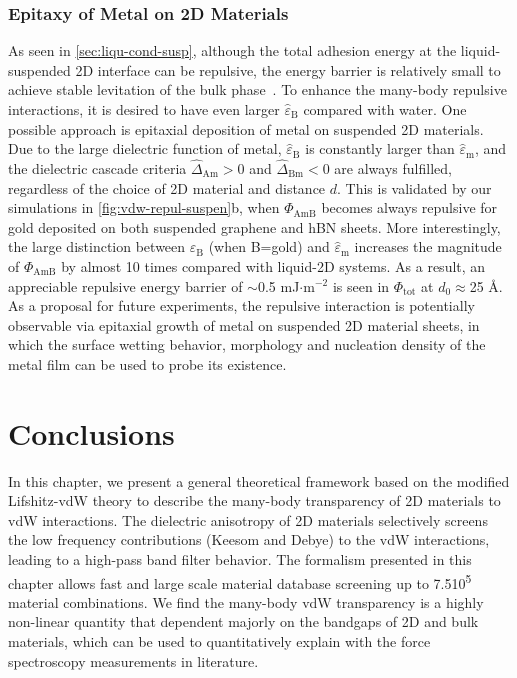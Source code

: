\subsubsection{Epitaxy of Metal on 2D Materials}
\label{sec:epitaxy-metal-2d}

As seen in \autoref{sec:liqu-cond-susp}, although the total adhesion
energy at the liquid-suspended 2D interface can be repulsive, the
energy barrier is relatively small to achieve stable levitation of the
bulk phase~\cite{Zhao_2019_casimir_trap}.
%
To enhance the many-body repulsive interactions, it is desired to have
even larger $\hat{\varepsilon}_{\mathrm{B}}$ compared with water. One
possible approach is epitaxial deposition of metal on suspended 2D
materials.
%
Due to the large dielectric function of metal,
$\hat{\varepsilon}_{\mathrm{B}}$ is constantly larger than
$\hat{\varepsilon}_{\mathrm{m}}$, and the dielectric cascade criteria
$\hat{\Delta}_{\mathrm{Am}} > 0$ and $\hat{\Delta}_{\mathrm{Bm}} < 0$
are always fulfilled, regardless of the choice of 2D material and
distance $d$.
%
This is validated by our simulations in
\autoref{fig:vdw-repul-suspen}b, when $\Phi_{\mathrm{AmB}}$ becomes
always repulsive for gold deposited on both suspended graphene and hBN
sheets.
%
More interestingly, the large distinction between
$\hat{\varepsilon}_{\mathrm{B}}$ (when B=gold) and
$\hat{\varepsilon}_{\mathrm{m}}$
increases the magnitude of $\Phi_{\mathrm{AmB}}$ by almost 10 times
compared with liquid-2D systems. As a result, an appreciable repulsive
energy barrier of $\sim{}$0.5 mJ$\cdot$m$^{-2}$ is seen in
$\Phi_{\mathrm{tot}}$ at $d_{0} \approx$25 \AA{}.
%
%
As a proposal for future experiments, the repulsive interaction is
potentially observable via epitaxial growth of metal on suspended 2D
material sheets, in which the surface wetting behavior, morphology and
nucleation density of the metal film can be used to probe its
existence.



\section{Conclusions}
\label{sec:vdw-conclusion}

In this chapter, we present a general theoretical framework based on
the modified Lifshitz-vdW theory to describe the many-body
transparency of 2D materials to vdW interactions.
%
The dielectric anisotropy of 2D materials selectively screens the 
low frequency contributions (Keesom and Debye) to the vdW interactions, leading to a high-pass band filter behavior.
%
The formalism presented in this chapter allows fast and large scale
material database screening up to 7.5\texttimes{}10\textsuperscript{5}
material combinations.
%
We find the many-body vdW transparency is a highly non-linear quantity
that dependent majorly on the bandgaps of 2D and bulk materials, which
can be used to quantitatively explain with the force spectroscopy measurements in literature.

